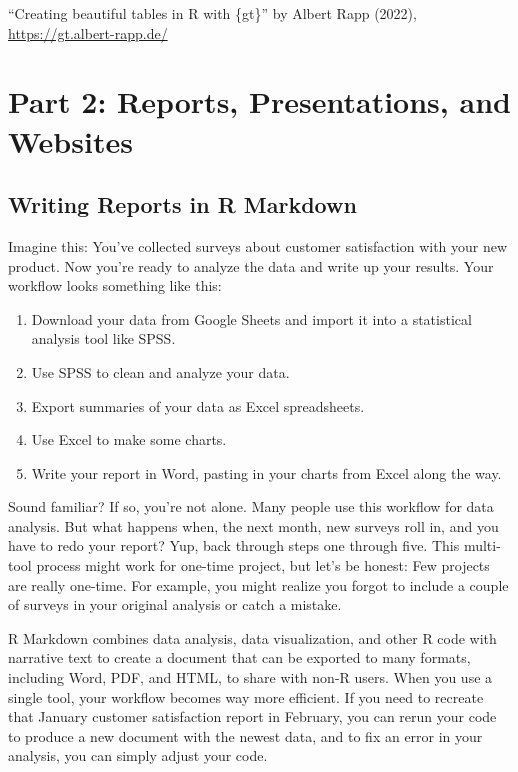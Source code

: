 \documentclass[
]{book}
\providecommand{\tightlist}{%
  \setlength{\itemsep}{0pt}\setlength{\parskip}{0pt}}
\begin{document}
``Creating beautiful tables in R with \{gt\}'' by Albert Rapp (2022), \url{https://gt.albert-rapp.de/}

\hypertarget{part-part-2-reports-presentations-and-websites}{%
\part*{Part 2: Reports, Presentations, and Websites}\label{part-part-2-reports-presentations-and-websites}}

\hypertarget{rmarkdown-chapter}{%
\chapter{Writing Reports in R Markdown}\label{rmarkdown-chapter}}

Imagine this: You've collected surveys about customer satisfaction with your new product. Now you're ready to analyze the data and write up your results. Your workflow looks something like this:

\begin{enumerate}
\def\labelenumi{\arabic{enumi}.}
\tightlist
\item
  Download your data from Google Sheets and import it into a statistical analysis tool like SPSS.
\item
  Use SPSS to clean and analyze your data.
\item
  Export summaries of your data as Excel spreadsheets.
\item
  Use Excel to make some charts.
\item
  Write your report in Word, pasting in your charts from Excel along the way.
\end{enumerate}

Sound familiar? If so, you're not alone. Many people use this workflow for data analysis. But what happens when, the next month, new surveys roll in, and you have to redo your report? Yup, back through steps one through five. This multi-tool process might work for one-time project, but let's be honest: Few projects are really one-time. For example, you might realize you forgot to include a couple of surveys in your original analysis or catch a mistake.

R Markdown combines data analysis, data visualization, and other R code with narrative text to create a document that can be exported to many formats, including Word, PDF, and HTML, to share with non-R users. When you use a single tool, your workflow becomes way more efficient. If you need to recreate that January customer satisfaction report in February, you can rerun your code to produce a new document with the newest data, and to fix an error in your analysis, you can simply adjust your code.
\end{document}
